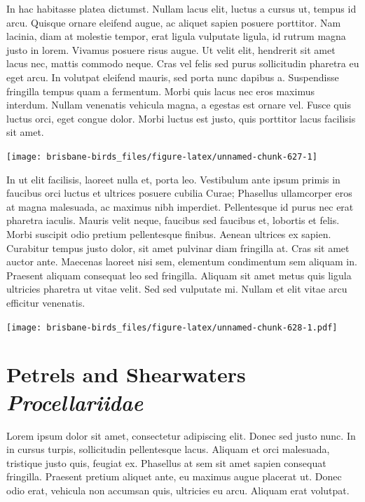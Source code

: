 \documentclass[]{book}
\let\origfigure\figure
\let\endorigfigure\endfigure
\renewenvironment{figure}[1][2] {
  \expandafter\origfigure\expandafter[H]
} {
  \endorigfigure
}
\begin{document}
In hac habitasse platea dictumst. Nullam lacus elit, luctus a cursus ut,
tempus id arcu. Quisque ornare eleifend augue, ac aliquet sapien posuere
porttitor. Nam lacinia, diam at molestie tempor, erat ligula vulputate
ligula, id rutrum magna justo in lorem. Vivamus posuere risus augue. Ut
velit elit, hendrerit sit amet lacus nec, mattis commodo neque. Cras vel
felis sed purus sollicitudin pharetra eu eget arcu. In volutpat eleifend
mauris, sed porta nunc dapibus a. Suspendisse fringilla tempus quam a
fermentum. Morbi quis lacus nec eros maximus interdum. Nullam venenatis
vehicula magna, a egestas est ornare vel. Fusce quis luctus orci, eget
congue dolor. Morbi luctus est justo, quis porttitor lacus facilisis sit
amet.

\begin{figure}
\texttt{[image: brisbane-birds\_files/figure-latex/unnamed-chunk-627-1]} \caption{insert figure caption}\label{fig:unnamed-chunk-627}
\end{figure}

In ut elit facilisis, laoreet nulla et, porta leo. Vestibulum ante ipsum
primis in faucibus orci luctus et ultrices posuere cubilia Curae;
Phasellus ullamcorper eros at magna malesuada, ac maximus nibh
imperdiet. Pellentesque id purus nec erat pharetra iaculis. Mauris velit
neque, faucibus sed faucibus et, lobortis et felis. Morbi suscipit odio
pretium pellentesque finibus. Aenean ultrices ex sapien. Curabitur
tempus justo dolor, sit amet pulvinar diam fringilla at. Cras sit amet
auctor ante. Maecenas laoreet nisi sem, elementum condimentum sem
aliquam in. Praesent aliquam consequat leo sed fringilla. Aliquam sit
amet metus quis ligula ultricies pharetra ut vitae velit. Sed sed
vulputate mi. Nullam et elit vitae arcu efficitur venenatis.

\begin{figure}
\centering
\texttt{[image: brisbane-birds\_files/figure-latex/unnamed-chunk-628-1.pdf]}
\caption{\label{fig:unnamed-chunk-628}insert figure caption}
\end{figure}

\chapter{\texorpdfstring{Petrels and Shearwaters
\emph{Procellariidae}}{Petrels and Shearwaters Procellariidae}}\label{petrels-and-shearwaters-procellariidae}

Lorem ipsum dolor sit amet, consectetur adipiscing elit. Donec sed justo
nunc. In in cursus turpis, sollicitudin pellentesque lacus. Aliquam et
orci malesuada, tristique justo quis, feugiat ex. Phasellus at sem sit
amet sapien consequat fringilla. Praesent pretium aliquet ante, eu
maximus augue placerat ut. Donec odio erat, vehicula non accumsan quis,
ultricies eu arcu. Aliquam erat volutpat.
\end{document}

